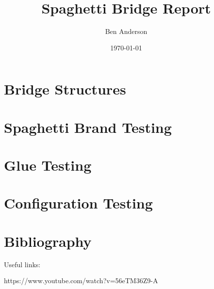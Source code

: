\documentclass[a4paper,11pt]{article}
\begin{document}
\title{Spaghetti Bridge Report}
\author{Ben Anderson}
\date{\today}
\maketitle
\pagebreak

\tableofcontents
\pagebreak


\section{Bridge Structures}




\section{Spaghetti Brand Testing}



\section{Glue Testing}

\section{Configuration Testing}

\section{}

\section{Bibliography}

Useful links:

https://www.youtube.com/watch?v=56eTM36Z9-A
\end{document}
